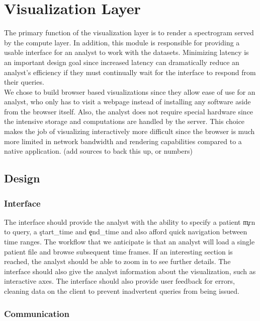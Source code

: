 \chapter{Visualization Layer}\label{viz-ch}

The primary function of the visualization layer is to render a spectrogram
served by the compute layer. In addition, this module is responsible for
providing a usable interface for an analyst to work with the datasets.
Minimizing latency is an important design goal since increased latency can
dramatically reduce an analyst's efficiency if they must continually wait for
the interface to respond from their queries. \\

We chose to build browser based visualizations since they allow ease of use for
an analyst, who only has to visit a webpage instead of installing any software
aside from the browser itself.  Also, the analyst does not require special
hardware since the intensive storage and computations are handled by the
server. This choice makes the job of visualizing interactively more difficult
since the browser is much more limited in network bandwidth and rendering
capabilities compared to a native application. (add sources to back this up, or numbers)

\section{Design}

\subsection{Interface}

The interface should provide the analyst with the ability to specify a patient
\c{mrn} to query, a \c{start\_time} and \c{end\_time} and also afford quick
navigation between time ranges. The workflow that we anticipate is that an
analyst will load a single patient file and browse subsequent time frames. If
an interesting section is reached, the analyst should be able to zoom in to see
further details. The interface should also give the analyst information about
the visualization, such as interactive axes. The interface should also provide
user feedback for errors, cleaning data on the client to prevent inadvertent
queries from being issued.

\subsection{Communication}

